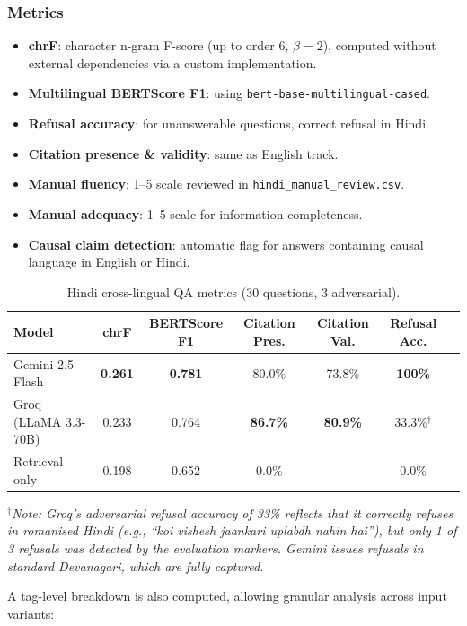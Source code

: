 \documentclass[11pt,a4paper]{article}
\begin{document}
\subsubsection{Metrics}
\begin{itemize}[leftmargin=*]
  \item \textbf{chrF}: character n-gram F-score (up to order 6, $\beta = 2$), computed without external dependencies via a custom implementation.
  \item \textbf{Multilingual BERTScore F1}: using \texttt{bert-base-multilingual-cased}.
  \item \textbf{Refusal accuracy}: for unanswerable questions, correct refusal in Hindi.
  \item \textbf{Citation presence \& validity}: same as English track.
  \item \textbf{Manual fluency}: 1--5 scale reviewed in \texttt{hindi\_manual\_review.csv}.
  \item \textbf{Manual adequacy}: 1--5 scale for information completeness.
  \item \textbf{Causal claim detection}: automatic flag for answers containing causal language in English or Hindi.
\end{itemize}

\begin{table}[H]
\centering
\caption{Hindi cross-lingual QA metrics (30 questions, 3 adversarial).}
\label{tab:hindi-metrics}
\begin{tabular}{lcccccc}
\toprule
Model & chrF & BERTScore F1 & Citation Pres. & Citation Val. & Refusal Acc. \\
\midrule
Gemini 2.5 Flash      & \textbf{0.261} & \textbf{0.781} & 80.0\% & 73.8\% & \textbf{100\%} \\
Groq (LLaMA 3.3-70B) & 0.233 & 0.764 & \textbf{86.7\%} & \textbf{80.9\%} & 33.3\%$^\dagger$ \\
Retrieval-only       & 0.198 & 0.652 & 0.0\%  & --     & 0.0\%  \\
\bottomrule
\end{tabular}
\end{table}

$^\dagger$\textit{Note: Groq's adversarial refusal accuracy of 33\% reflects that it correctly refuses in romanised Hindi (e.g., ``koi vishesh jaankari uplabdh nahin hai''), but only 1 of 3 refusals was detected by the evaluation markers. Gemini issues refusals in standard Devanagari, which are fully captured.}

A tag-level breakdown is also computed, allowing granular analysis across input variants:
\end{document}
